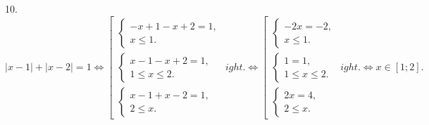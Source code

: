 10. $|x-1|+|x-2|=1\Leftrightarrow \left[\begin{array}{l}\begin{cases} -x+1-x+2=1,\\ x\leqslant 1.\end{cases}\\
\begin{cases} x-1-x+2=1,\\ 1\leqslant x\leqslant 2 .\end{cases}\\\begin{cases} x-1+x-2=1,\\ 2\leqslant x.\end{cases}\end{array}
ight.\Leftrightarrow
\left[\begin{array}{l}\begin{cases} -2x=-2,\\ x\leqslant 1.\end{cases}\\
\begin{cases} 1=1,\\ 1\leqslant x\leqslant 2 .\end{cases}\\\begin{cases} 2x=4,\\ 2\leqslant x.\end{cases}\end{array}
ight.\Leftrightarrow
x\in [1;2].$\\
